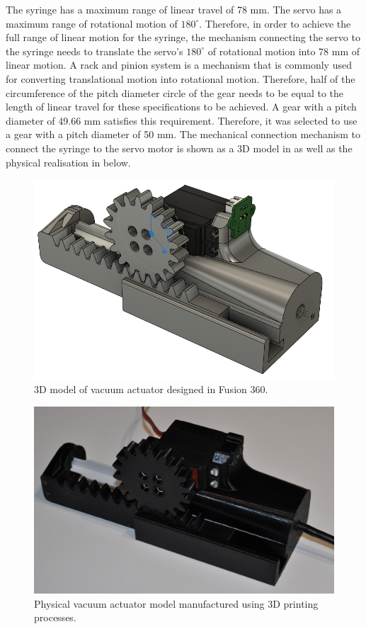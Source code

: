 The syringe has a maximum range of linear travel of 78 mm. The servo has a maximum range of rotational motion of $180^{\circ}$. Therefore, in order to achieve the full range of linear motion for the syringe, the mechanism connecting the servo to the syringe needs to translate the servo's $180^{\circ}$ of rotational motion into 78 mm of linear motion. A rack and pinion system is a mechanism that is commonly used for converting translational motion into rotational motion. Therefore, half of the circumference of the pitch diameter circle of the gear needs to be equal to the length of linear travel for these specifications to be achieved. A gear with a pitch diameter of 49.66 mm satisfies this requirement. Therefore, it was selected to use a gear with a pitch diameter of 50 mm. The mechanical connection mechanism to connect the syringe to the servo motor is shown as a 3D model in  as well as the physical realisation in  below.

\begin{figure}[H]
	\centering
	\includegraphics[width=0.6\linewidth]{figures/202109/vacuum-actuator-model.PNG}
	\caption{3D model of vacuum actuator designed in Fusion 360.}
	\label{fig:vacuum-actuator-model}
\end{figure}

\begin{figure}[H]
	\centering
	\includegraphics[width=0.6\linewidth]{figures/202109/vacuum-actuator.JPG}
	\caption{Physical vacuum actuator model manufactured using 3D printing processes.}
	\label{fig:vacuum-actuator}
\end{figure}

